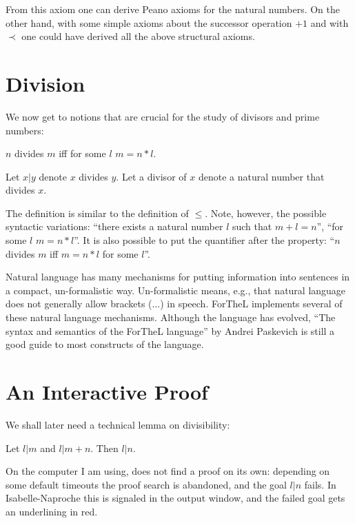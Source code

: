 \documentclass[11pt]{article}
\begin{document}
From this axiom one can derive Peano axioms for the
natural numbers. On the other hand, with some simple
axioms about the successor operation $+1$ and with $\prec$
one could have derived all the above structural axioms.

\section{Division}

We now get to notions that are crucial for the
study of divisors and prime numbers:

\begin{forthel}

\begin{definition}
  $n$ divides $m$ iff for some $l$ $m = n * l$.
\end{definition}

Let $x | y$ denote $x$ divides $y$.
Let a divisor of $x$ denote a natural number
that divides $x$.
\end{forthel}

The definition is similar to the definition of $\leq$.
Note, however, the possible syntactic variations:
``there exists a natural number $l$ such that
$m + l = n$'', ``for some $l$ $m = n * l$''. It is also possible
to put the quantifier after the property:
``$n$ divides $m$ iff $m = n * l$ for some $l$''.

Natural language has many mechanisms for putting
information into sentences in a compact, un-formalistic way.
Un-formalistic means, e.g., that natural language
does not generally allow brackets (...) in speech. ForTheL
implements several of these natural language mechanisms.
Although the language has evolved,
``The syntax and semantics of the ForTheL language'' by Andrei
Paskevich is still a good guide to most constructs of the
language.

\section{An Interactive Proof}

We shall later need a technical lemma on divisibility:

\begin{lemma} Let $l | m$ and $l | m + n$. Then $l | n$.
\end{lemma}

On the computer I am using, \Naproche does not find
a proof on its own: depending on some default timeouts the
proof search is abandoned, and the goal $l | n$ fails.
In Isabelle-Naproche this is signaled in the output
window, and the failed goal gets an underlining in red.
\end{document}
